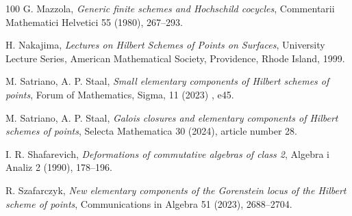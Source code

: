 \documentclass[11pt]{amsart}
\theoremstyle{definition}
\begin{document}
\begin{thebibliography}{100}
G. Mazzola, {\em Generic finite schemes and Hochschild cocycles}, Commentarii Mathematici Helvetici 55 (1980), 267--293.

H. Nakajima, {\em Lectures on Hilbert Schemes of Points on Surfaces}, University Lecture Series, American Mathematical Society, Providence, Rhode Island, 1999.

M. Satriano, A. P. Staal, {\em Small elementary components of Hilbert schemes of points}, Forum of Mathematics, Sigma, 11 (2023) , e45.

M. Satriano, A. P. Staal, {\em Galois closures and elementary components of Hilbert schemes of points}, Selecta Mathematica 30 (2024), article number 28.

I. R. Shafarevich, {\em Deformations of commutative algebras of class 2}, Algebra i Analiz 2 (1990), 178--196.	

R. Szafarczyk, {\em New elementary components of the Gorenstein locus of the Hilbert scheme of points}, Communications in Algebra 51 (2023), 2688--2704.

\end{thebibliography}
\end{document}
